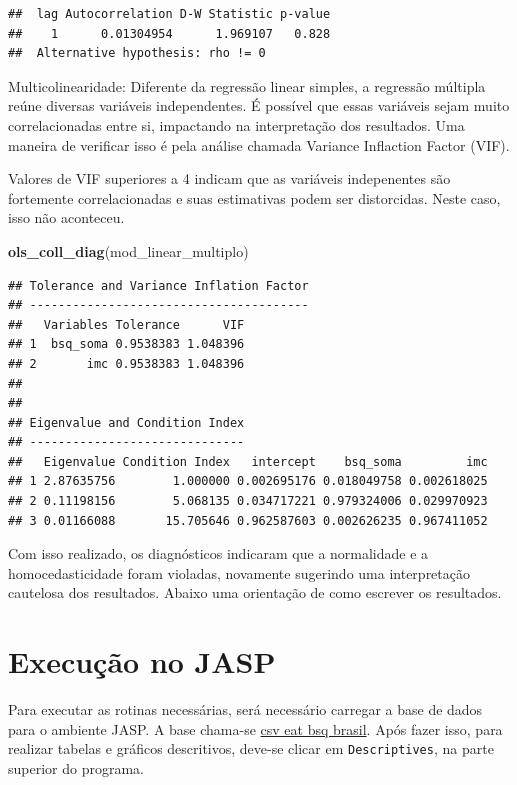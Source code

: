 \documentclass[
]{book}
\newenvironment{Shaded}{\begin{snugshade}}{\end{snugshade}}
\newcommand{\KeywordTok}[1]{\textcolor[rgb]{0.13,0.29,0.53}{\textbf{#1}}}
\newcommand{\NormalTok}[1]{#1}
\begin{document}
\begin{verbatim}
##  lag Autocorrelation D-W Statistic p-value
##    1      0.01304954      1.969107   0.828
##  Alternative hypothesis: rho != 0
\end{verbatim}

Multicolinearidade: Diferente da regressão linear simples, a regressão
múltipla reúne diversas variáveis independentes. É possível que essas
variáveis sejam muito correlacionadas entre si, impactando na
interpretação dos resultados. Uma maneira de verificar isso é pela
análise chamada Variance Inflaction Factor (VIF).

Valores de VIF superiores a 4 indicam que as variáveis indepenentes são
fortemente correlacionadas e suas estimativas podem ser distorcidas.
Neste caso, isso não aconteceu.

\begin{Shaded}
\begin{Highlighting}[]
\KeywordTok{ols_coll_diag}\NormalTok{(mod_linear_multiplo)}
\end{Highlighting}
\end{Shaded}

\begin{verbatim}
## Tolerance and Variance Inflation Factor
## ---------------------------------------
##   Variables Tolerance      VIF
## 1  bsq_soma 0.9538383 1.048396
## 2       imc 0.9538383 1.048396
## 
## 
## Eigenvalue and Condition Index
## ------------------------------
##   Eigenvalue Condition Index   intercept    bsq_soma         imc
## 1 2.87635756        1.000000 0.002695176 0.018049758 0.002618025
## 2 0.11198156        5.068135 0.034717221 0.979324006 0.029970923
## 3 0.01166088       15.705646 0.962587603 0.002626235 0.967411052
\end{verbatim}

Com isso realizado, os diagnósticos indicaram que a normalidade e a
homocedasticidade foram violadas, novamente sugerindo uma interpretação
cautelosa dos resultados. Abaixo uma orientação de como escrever os
resultados.

\hypertarget{execuuxe7uxe3o-no-jasp-15}{%
\section{Execução no JASP}\label{execuuxe7uxe3o-no-jasp-15}}

Para executar as rotinas necessárias, será necessário carregar a base de
dados para o ambiente JASP. A base chama-se
\href{https://www.dropbox.com/s/l8xkxi5z5fntrd9/csv\%20eat\%20bsq\%20brasil.csv?dl=0}{csv
eat bsq brasil}. Após fazer isso, para realizar tabelas e gráficos
descritivos, deve-se clicar em \texttt{Descriptives}, na parte superior
do programa.
\end{document}
